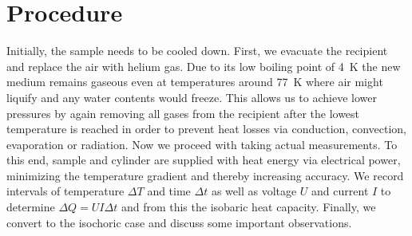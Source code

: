 \section{Procedure}
\label{sec:procedure}

Initially, the sample needs to be cooled down. First, we evacuate the recipient and replace the air with
helium gas. Due to its low boiling point of \qty{4}{\kelvin} the new medium remains gaseous even
at temperatures around \qty{77}{\kelvin} where air might liquify and any water contents would freeze.
This allows us to achieve lower pressures by again removing all gases from the recipient after the
lowest temperature is reached in order to prevent heat losses via conduction, convection, evaporation
or radiation. Now we proceed with taking actual measurements. To this end, sample and cylinder
are supplied with heat energy via electrical power, minimizing the temperature gradient and thereby increasing
accuracy. We record intervals of temperature $\Delta T$ and time $\Delta t$ as well as voltage
$U$ and current $I$ to determine $\Delta Q = UI \Delta t$ and from this the isobaric heat capacity.
Finally, we convert to the isochoric case and discuss some important observations.
\enlargethispage{\baselineskip}\newpage

